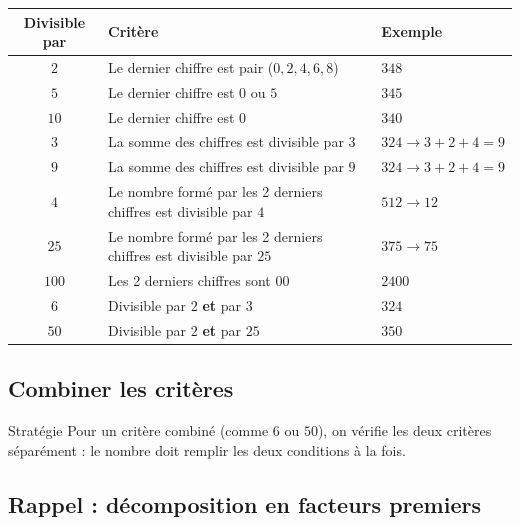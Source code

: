 \def\arraystretch{1.3}
\begin{tabularx}{\linewidth}{|c|X|X|}
\hline
\cellcolor{themeNO!30}\textbf{Divisible par} & \cellcolor{themeNO!30}\textbf{Critère} & \cellcolor{themeNO!30}\textbf{Exemple} \\\hline
$2$ & Le dernier chiffre est pair ($0,2,4,6,8$) & $348$ \\\hline
$5$ & Le dernier chiffre est $0$ ou $5$ & $345$ \\\hline
$10$ & Le dernier chiffre est $0$ & $340$ \\\hline
$3$ & La somme des chiffres est divisible par $3$ & $324 \to 3{+}2{+}4=9$ \\\hline
$9$ & La somme des chiffres est divisible par $9$ & $324 \to 3{+}2{+}4=9$ \\\hline
$4$ & Le nombre formé par les 2 derniers chiffres est divisible par $4$ & $512 \to 12$ \\\hline
$25$ & Le nombre formé par les 2 derniers chiffres est divisible par $25$ & $375 \to 75$ \\\hline
$100$ & Les 2 derniers chiffres sont $00$ & $2400$ \\\hline
$6$ & Divisible par $2$ \textbf{et} par $3$ & $324$ \\\hline
$50$ & Divisible par $2$ \textbf{et} par $25$ & $350$ \\\hline
\end{tabularx}
\def\arraystretch{1}

\vspace{10pt}
\subsection{Combiner les critères}

\begin{astuce}{Stratégie}
Pour un critère combiné (comme $6$ ou $50$), on vérifie les deux critères séparément : le nombre doit remplir les deux conditions à la fois.
\end{astuce}


\newpage
\semaineinvisible
{} 

\vfill
\subsection{Rappel : décomposition en facteurs premiers}

